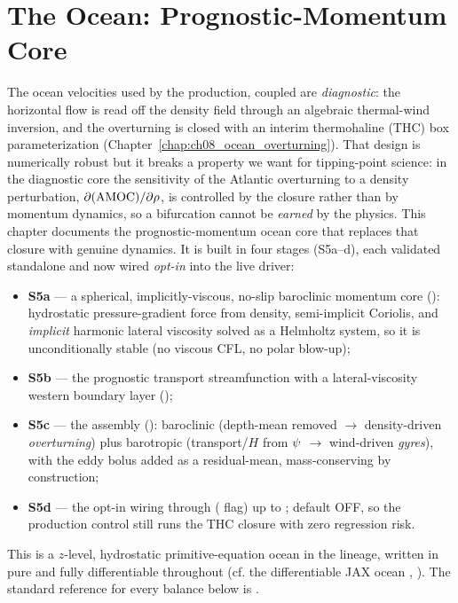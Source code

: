 \chapter{The Ocean: Prognostic-Momentum Core}\label{chap:ch07_ocean_prognostic_core}

\providecommand{\taux}{\tau^{x}}                 %
\providecommand{\tauy}{\tau^{y}}                 %
\providecommand{\wbc}{\delta_{\mathrm{S}}}        %

The ocean velocities used by the production, coupled \model{} are \emph{diagnostic}: the
horizontal flow is read off the density field through an algebraic thermal-wind inversion,
and the overturning is closed with an interim thermohaline (THC) box parameterization
(Chapter~\ref{chap:ch08_ocean_overturning}). That design is numerically robust but it
breaks a property we want for tipping-point science: in the diagnostic core the sensitivity
of the Atlantic overturning to a density perturbation, $\partial(\mathrm{AMOC})/\partial\rho$,
is controlled by the closure rather than by momentum dynamics, so a bifurcation cannot be
\emph{earned} by the physics. This chapter documents the prognostic-momentum ocean core that
replaces that closure with genuine dynamics. It is built in four stages (S5a--d), each
validated standalone and now wired \emph{opt-in} into the live driver:
\begin{itemize}
  \item \textbf{S5a} --- a spherical, implicitly-viscous, no-slip baroclinic momentum core
        (): hydrostatic pressure-gradient force from density,
        semi-implicit Coriolis, and \emph{implicit} harmonic lateral viscosity solved as a
        Helmholtz system, so it is unconditionally stable (no viscous CFL, no polar blow-up);
  \item \textbf{S5b} --- the prognostic transport streamfunction with a \citet{munk1950}
        lateral-viscosity western boundary layer ();
  \item \textbf{S5c} --- the assembly (): baroclinic (depth-mean removed
        $\to$ density-driven \emph{overturning}) plus barotropic (transport/$H$ from $\psi$
        $\to$ wind-driven \emph{gyres}), with the \citet{gentmcwilliams1990} eddy bolus added
        as a residual-mean, mass-conserving by construction;
  \item \textbf{S5d} --- the opt-in wiring through 
        ( flag) up to
        ; default OFF, so the production
        control still runs the THC closure with zero regression risk.
\end{itemize}
This is a $z$-level, hydrostatic primitive-equation ocean in the \citet{bryan1969} lineage,
written in pure \jax{} and fully differentiable throughout
(cf. the differentiable JAX ocean , \citealp{hafner2018veros}). The standard
reference for every balance below is \citet{vallis2017}.


